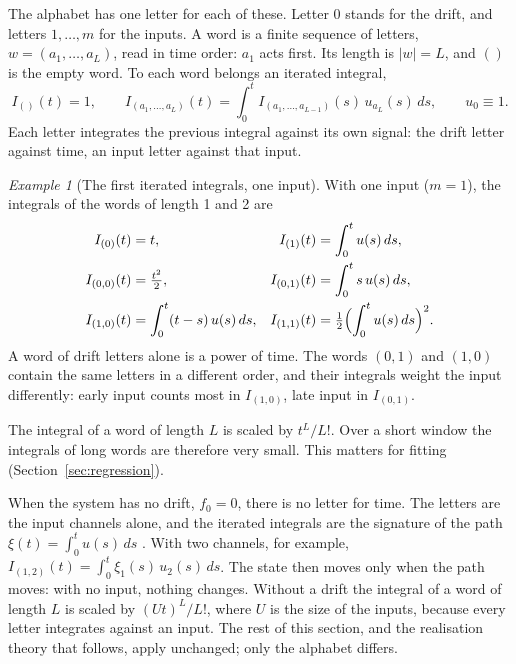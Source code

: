 \documentclass[11pt,a4paper]{article}
\theoremstyle{remark}
\newtheorem{example}{Example}
\begin{document}
The alphabet has one letter for each of these.
Letter $0$ stands for the drift, and letters $1,\dots,m$ for the inputs.
A word is a finite sequence of letters, $w=(a_1,\dots,a_L)$, read in time order: $a_1$ acts first.
Its length is $|w|=L$, and $()$ is the empty word.
To each word belongs an iterated integral,
\begin{equation}\label{eq:iterated}
I_{()}(t)=1,\qquad I_{(a_1,\dots,a_L)}(t)=\int_0^t I_{(a_1,\dots,a_{L-1})}(s)\,u_{a_L}(s)\,ds,\qquad u_0\equiv 1 .
\end{equation}
Each letter integrates the previous integral against its own signal: the drift letter against time, an input letter against that input.

\begin{example}[The first iterated integrals, one input]\label{ex:integrals}
With one input ($m=1$), the integrals of the words of length 1 and 2 are
\begin{align*}
I_{(0)}(t)&=t, & I_{(1)}(t)&=\int_0^t u(s)\,ds,\\
I_{(0,0)}(t)&=\tfrac{t^2}{2}, & I_{(0,1)}(t)&=\int_0^t s\,u(s)\,ds,\\
I_{(1,0)}(t)&=\int_0^t (t-s)\,u(s)\,ds, & I_{(1,1)}(t)&=\tfrac12\Bigl(\int_0^t u(s)\,ds\Bigr)^2 .
\end{align*}
A word of drift letters alone is a power of time.
The words $(0,1)$ and $(1,0)$ contain the same letters in a different order, and their integrals weight the input differently: early input counts most in $I_{(1,0)}$, late input in $I_{(0,1)}$.
\end{example}

The integral of a word of length $L$ is scaled by $t^L/L!$.
Over a short window the integrals of long words are therefore very small.
This matters for fitting (Section~\ref{sec:regression}).

When the system has no drift, $f_0=0$, there is no letter for time.
The letters are the input channels alone, and the iterated integrals are the signature of the path $\xi(t)=\int_0^tu(s)\,ds$ \cite{Chen1957,Lyons1998}.
With two channels, for example, $I_{(1,2)}(t)=\int_0^t\xi_1(s)\,u_2(s)\,ds$.
The state then moves only when the path moves: with no input, nothing changes.
Without a drift the integral of a word of length $L$ is scaled by $(Ut)^L/L!$, where $U$ is the size of the inputs, because every letter integrates against an input.
The rest of this section, and the realisation theory that follows, apply unchanged; only the alphabet differs.
\end{document}
